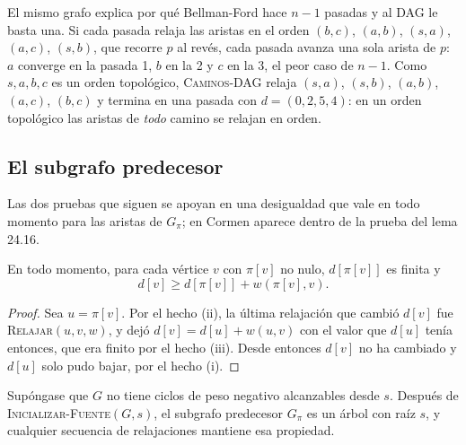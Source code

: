 \documentclass[11pt,letterpaper]{article}
\begin{document}
El mismo grafo explica por qué Bellman-Ford hace $n - 1$ pasadas y
al DAG le basta una. Si cada pasada relaja las aristas en el orden
$(b, c)$, $(a, b)$, $(s, a)$, $(a, c)$, $(s, b)$, que recorre $p$ al
revés, cada pasada avanza una sola arista de $p$: $a$ converge en la
pasada 1, $b$ en la 2 y $c$ en la 3, el peor caso de $n - 1$. Como
$s, a, b, c$ es un orden topológico, \textsc{Caminos-DAG} relaja
$(s, a)$, $(s, b)$, $(a, b)$, $(a, c)$, $(b, c)$ y termina en una
pasada con $d = (0, 2, 5, 4)$: en un orden topológico las aristas de
\emph{todo} camino se relajan en orden.


\subsection*{El subgrafo predecesor}

Las dos pruebas que siguen se apoyan en una desigualdad que vale en
todo momento para las aristas de $G_\pi$; en Cormen aparece dentro de
la prueba del lema 24.16.

\begin{lema}\label{lem:prueba-arista-pred}
  En todo momento, para cada vértice $v$ con $\pi[v]$ no nulo,
  $d[\pi[v]]$ es finita y
  \[
    d[v] \ge d[\pi[v]] + w(\pi[v], v) .
  \]
\end{lema}

\begin{proof}
  Sea $u = \pi[v]$. Por el hecho (ii), la última relajación que cambió
  $d[v]$ fue \textsc{Relajar}$(u, v, w)$, y dejó
  $d[v] = d[u] + w(u, v)$ con el valor que $d[u]$ tenía entonces, que
  era finito por el hecho (iii). Desde entonces $d[v]$ no ha cambiado
  y $d[u]$ solo pudo bajar, por el hecho (i).
\end{proof}

\begin{lema}[$G_\pi$ es un árbol]\label{lem:prueba-gpi-arbol}
  Supóngase que $G$ no tiene ciclos de peso negativo alcanzables desde
  $s$. Después de \textsc{Inicializar-Fuente}$(G, s)$, el subgrafo
  predecesor $G_\pi$ es un árbol con raíz $s$, y cualquier secuencia
  de relajaciones mantiene esa propiedad.
\end{lema}
\end{document}
